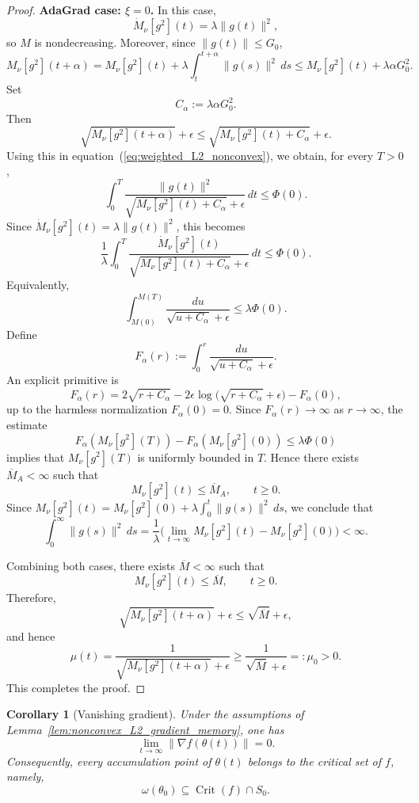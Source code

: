 \documentclass{article} %
\newtheorem{corollary}{Corollary}
\begin{document}
\begin{proof}
\noindent\textbf{AdaGrad case: \(\xi=0\).}
In this case,
\[
    \dot M_\nu[g^2](t)=\lambda\|g(t)\|^2,
\]
so \(M\) is nondecreasing. Moreover, since \(\|g(t)\|\leq G_0\),
\[
    M_\nu[g^2](t+\alpha)
    =
    M_\nu[g^2](t)+\lambda\int_t^{t+\alpha}\|g(s)\|^2\,ds
    \leq
    M_\nu[g^2](t)+\lambda\alpha G_0^2.
\]
Set
\[
    C_\alpha:=\lambda\alpha G_0^2.
\]
Then
\[
    \sqrt{M_\nu[g^2](t+\alpha)}+\epsilon
    \leq
    \sqrt{M_\nu[g^2](t)+C_\alpha}+\epsilon.
\]
Using this in equation~(\ref{eq:weighted_L2_nonconvex}), we obtain, for every \(T>0\),
\[
    \int_0^T
    \frac{\|g(t)\|^2}{\sqrt{M_\nu[g^2](t)+C_\alpha}+\epsilon}\,dt
    \leq
    \Phi(0).
\]
Since \(\dot M_\nu[g^2](t)=\lambda\|g(t)\|^2\), this becomes
\[
    \frac1\lambda
    \int_0^T
    \frac{\dot M_\nu[g^2](t)}
    {\sqrt{M_\nu[g^2](t)+C_\alpha}+\epsilon}\,dt
    \leq
    \Phi(0).
\]
Equivalently,
\[
    \int_{M(0)}^{M(T)}
    \frac{du}{\sqrt{u+C_\alpha}+\epsilon}
    \leq
    \lambda\Phi(0).
\]
Define
\[
    F_\alpha(r)
    :=
    \int_0^r
    \frac{du}{\sqrt{u+C_\alpha}+\epsilon}.
\]
An explicit primitive is
\[
    F_\alpha(r)
    =
    2\sqrt{r+C_\alpha}
    -
    2\epsilon\log\bigl(\sqrt{r+C_\alpha}+\epsilon\bigr)
    -
    F_\alpha(0),
\]
up to the harmless normalization \(F_\alpha(0)=0\). Since $F_\alpha(r)\to\infty$ as $r\to\infty$, the estimate
\[
    F_\alpha(M_\nu[g^2](T))-F_\alpha(M_\nu[g^2](0))
    \leq
    \lambda\Phi(0)
\]
implies that \(M_\nu[g^2](T)\) is uniformly bounded in \(T\). Hence there exists \(\overline M_A<\infty\) such that
\[
    M_\nu[g^2](t)\leq \overline M_A,
    \qquad t\geq0.
\]
Since $M_\nu[g^2](t)=M_\nu[g^2](0)+\lambda\int_0^t\|g(s)\|^2\,ds$, we conclude that
\[
    \int_0^\infty\|g(s)\|^2\,ds
    =
    \frac{1}{\lambda}\bigl(\lim_{t\to\infty}M_\nu[g^2](t)-M_\nu[g^2](0)\bigr)
    <\infty.
\]

Combining both cases, there exists \(\overline M<\infty\) such that
\[
    M_\nu[g^2](t)\leq \overline M,
    \qquad t\geq0.
\]
Therefore,
\[
    \sqrt{M_\nu[g^2](t+\alpha)}+\epsilon
    \leq
    \sqrt{\overline M}+\epsilon,
\]
and hence
\[
    \mu(t)
    =
    \frac{1}{\sqrt{M_\nu[g^2](t+\alpha)}+\epsilon}
    \geq
    \frac{1}{\sqrt{\overline M}+\epsilon}
    =:\mu_0>0.
\]
This completes the proof.
\end{proof}


\begin{corollary}[Vanishing gradient]
\label{cor:nonconvex_vanishing_gradient}
Under the assumptions of Lemma~\ref{lem:nonconvex_L2_gradient_memory}, one has
\[
    \lim_{t\to\infty}\|\nabla f(\theta(t))\|=0.
\]
Consequently, every accumulation point of \(\theta(t)\) belongs to the critical set of \(f\), namely,
\[
    \omega(\theta_0)\subseteq \operatorname{Crit}(f)\cap S_0.
\]
\end{corollary}
\end{document}
